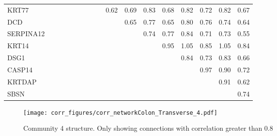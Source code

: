 \begin{longtable}{lrrrrrrrrrrrrrrrr}
KRT77     &               &            &           &              &            &            &            &             &      0.62 &            0.69 &        0.83 &       0.68 &         0.82 &         0.72 &       0.82 &          0.67 \\
DCD       &               &            &           &              &            &            &            &             &           &            0.65 &        0.77 &       0.65 &         0.80 &         0.76 &       0.74 &          0.64 \\
SERPINA12 &               &            &           &              &            &            &            &             &           &                 &        0.74 &       0.77 &         0.84 &         0.71 &       0.73 &          0.55 \\
KRT14     &               &            &           &              &            &            &            &             &           &                 &             &       0.95 &         1.05 &         0.85 &       1.05 &          0.84 \\
DSG1      &               &            &           &              &            &            &            &             &           &                 &             &            &         0.84 &         0.73 &       0.83 &          0.66 \\
CASP14    &               &            &           &              &            &            &            &             &           &                 &             &            &              &         0.97 &       0.90 &          0.72 \\
KRTDAP    &               &            &           &              &            &            &            &             &           &                 &             &            &              &              &       0.91 &          0.62 \\
SBSN      &               &            &           &              &            &            &            &             &           &                 &             &            &              &              &            &          0.74 \\
\end{longtable}


\begin{figure}[h!]
\centering
\texttt{[image: corr\_figures/corr\_networkColon\_Transverse\_4.pdf]}
\caption{Community 4 structure. Only showing connections with correlation greater than 0.8}
\end{figure}




